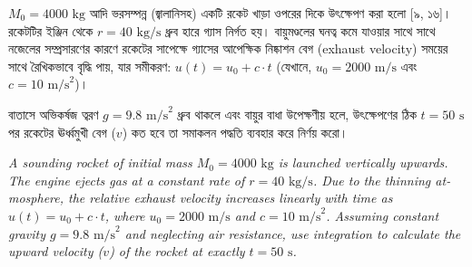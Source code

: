 \documentclass[12pt, a4paper]{article}
\begin{document}
\begin{tcolorbox}[questionbox={প্রশ্ন (Question)12}]
\noindent
$M_0 = 4000\text{ kg}$ আদি ভরসম্পন্ন (জ্বালানিসহ) একটি রকেট খাড়া ওপরের দিকে উৎক্ষেপণ করা হলো [৯, ১৬]। রকেটটির ইঞ্জিন থেকে $r = 40\text{ kg/s}$ ধ্রুব হারে গ্যাস নির্গত হয়। বায়ুমণ্ডলের ঘনত্ব কমে যাওয়ার সাথে সাথে নজেলের সম্প্রসারণের কারণে রকেটের সাপেক্ষে গ্যাসের আপেক্ষিক নিষ্কাশন বেগ (exhaust velocity) সময়ের সাথে রৈখিকভাবে বৃদ্ধি পায়, যার সমীকরণ: $u(t) = u_0 + c \cdot t$ (যেখানে, $u_0 = 2000\text{ m/s}$ এবং $c = 10\text{ m/s}^2$)। 

\vspace{0.3em}
\noindent
বাতাসে অভিকর্ষজ ত্বরণ $g = 9.8\text{ m/s}^2$ ধ্রুব থাকলে এবং বায়ুর বাধা উপেক্ষণীয় হলে, উৎক্ষেপণের ঠিক $t = 50\text{ s}$ পর রকেটের ঊর্ধ্বমুখী বেগ ($v$) কত হবে তা সমাকলন পদ্ধতি ব্যবহার করে নির্ণয় করো।

\vspace{0.8em}
\begin{english}
\noindent\textit{\color{darkgray}
A sounding rocket of initial mass $M_0 = 4000\text{ kg}$ is launched vertically upwards. The engine ejects gas at a constant rate of $r = 40\text{ kg/s}$. Due to the thinning atmosphere, the relative exhaust velocity increases linearly with time as $u(t) = u_0 + c \cdot t$, where $u_0 = 2000\text{ m/s}$ and $c = 10\text{ m/s}^2$. Assuming constant gravity $g = 9.8\text{ m/s}^2$ and neglecting air resistance, use integration to calculate the upward velocity ($v$) of the rocket at exactly $t = 50\text{ s}$.
}
\end{english}
\end{tcolorbox}
\end{document}

